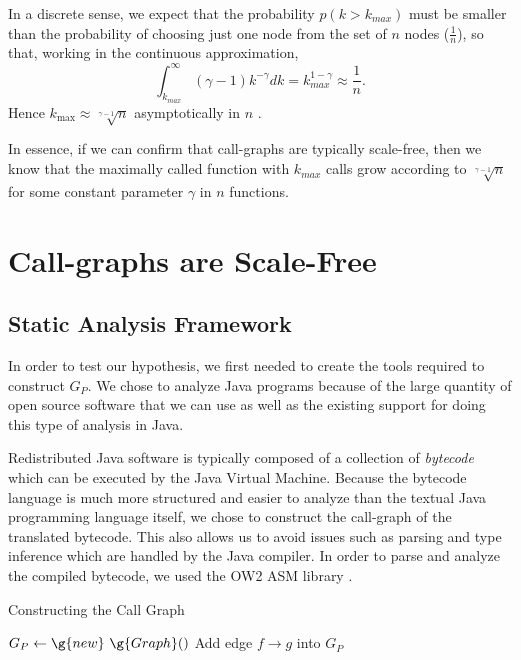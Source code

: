 \documentclass[11pt,a4paper,twocolumn]{article}
\begin{document}
\begin{singlespace}
In a discrete sense, we expect that the probability $p\left(k>k_{max}\right)$
must be smaller than the probability of choosing just one node from the set
of $n$ nodes ($\frac{1}{n}$), so that, working in the continuous approximation,
\begin{equation}\int_{k_{max}}^{\infty} (\gamma-1)k^{-\gamma} dk
=k_{max}^{1-\gamma}\approx \frac{1}{n}.\end{equation}
Hence $k_{\max}\approx \sqrt[\gamma - 1]{n}$ asymptotically in $n$ \cite{CLASS}.

In essence, if we can confirm that call-graphs are typically scale-free, then we know
that the maximally called function with $k_{max}$ calls grow according to 
$\sqrt[\gamma - 1]{n}$ for some constant parameter $\gamma$ in $n$ functions.
\section{Call-graphs are Scale-Free}
\subsection{Static Analysis Framework}

In order to test our hypothesis, we first needed to create the tools required
to construct $G_P$. We chose to analyze Java programs because of the large
quantity of open source software that we can use as well as the existing
support for doing this type of analysis in Java.

Redistributed Java software is typically composed of a collection of
\emph{bytecode} which can be executed by the Java Virtual Machine. Because the
bytecode language is much more structured and easier to analyze than the
textual Java programming language itself, we chose to construct the call-graph
of the translated bytecode. This also allows us to avoid issues such as
parsing and type inference which are handled by the Java compiler. In order
to parse and analyze the compiled bytecode, we used the OW2 ASM library
\cite{ocwasm}.

\begin{algorithm}
\caption{Constructing the Call Graph}
\begin{algorithmic}
\State $G_P \gets \g{new}~ \g{Graph}()$
\State Add edge $f \to g$ into $G_P$
\EndIf
\EndFor
\EndFor
\EndFunction
\end{algorithmic}
\label{fig:construction}
\end{algorithm}


\end{singlespace}
\end{document}
